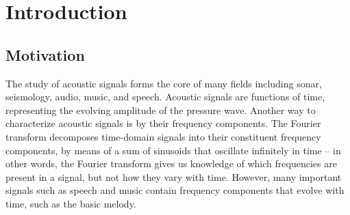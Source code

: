 \documentclass[letter,12pt,notitlepage]{article}
\title{\ThesisTitle}
\author{\vspace{1em}\\Sevag Hanssian \\
  McGill University \\
 \small{\texttt{sevag.hanssian@mail.mcgill.ca}} \\
 \small{\texttt{sevagh@protonmail.com}} \\\ \\\ \\
 \small{Thesis for Master of Arts in Music Technology}\\
 \small{Date TBD, 2021}}
\date{}
\begin{document}
\maketitle

\vspace{3.5em}

\begin{abstract}
	The short-time Fourier transform (STFT) is an important tool for the time-frequency analysis of acoustic signals. The STFT is commonly used as the input representation of music signals in deep learning models. Examples of music information retrieval (MIR) tasks where such models have achieved success are onset detection, beat tracking, and music source separation. Despite its ubiquity, the STFT has a fixed and bounded time-frequency resolution, such that one must sacrifice time for frequency resolution (or vice versa) by changing the window size. The Nonstationary Gabor Transform (NSGT) is an adaptive time-frequency transform which can vary its time-frequency resolution to better represent music signals. In this thesis, first the STFT and NSGT are described as tools for representing and manipulating music signals. Next, the STFT is replaced with different configurations of the NSGT in deep learning models for onset detection, beat tracking, and music source separation respectively, showing significant improvements in the results.
\end{abstract}

\vfill
\clearpage %

\tableofcontents

\vfill
\clearpage %

\listoffigures

\listoflistings

\vfill
\clearpage %

\section{Introduction}
\label{sec:intro}

\subsection{Motivation}

The study of acoustic signals forms the core of many fields including sonar, seismology, audio, music, and speech. Acoustic signals are functions of time, representing the evolving amplitude of the pressure wave. Another way to characterize acoustic signals is by their frequency components. The Fourier transform decomposes time-domain signals into their constituent frequency components, by means of a sum of sinusoids that oscillate infinitely in time -- in other words, the Fourier transform gives us knowledge of which frequencies are present in a signal, but not how they vary with time. However, many important signals such as speech and music contain frequency components that evolve with time, such as the basic melody.
\end{document}
